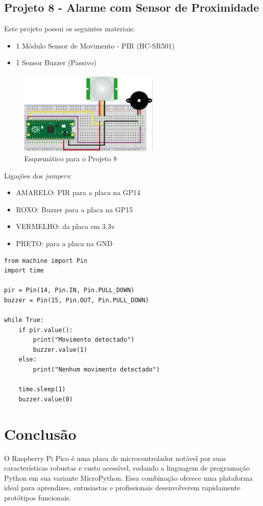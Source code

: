 \documentclass[a4paper,11pt]{article}
\begin{document}
\subsection{Projeto 8 - Alarme com Sensor de Proximidade}

Este projeto possui os seguintes materiais: \vspace{-1em}
\begin{itemize}
	\item 1 Módulo Sensor de Movimento - PIR (HC-SR501)
	\item 1 Sensor Buzzer (Passivo)
\end{itemize}

\begin{figure}[H]
	\centering
	\includegraphics[width=0.6\textwidth]{imagem/PicoProj8}
	\caption{Esquemático para o Projeto 8}
\end{figure}

Ligações dos \textit{jumpers}: \vspace{-1em}
\begin{itemize}
	\item AMARELO: PIR para a placa na GP14
	\item ROXO: Buzzer para a placa na GP15
	\item VERMELHO: da placa em 3.3v
	\item PRETO: para a placa na GND
\end{itemize}

\begin{lstlisting}
from machine import Pin
import time

pir = Pin(14, Pin.IN, Pin.PULL_DOWN)
buzzer = Pin(15, Pin.OUT, Pin.PULL_DOWN)

while True:
    if pir.value():
        print("Movimento detectado")
        buzzer.value(1)
    else:
        print("Nenhum movimento detectado")

    time.sleep(1)
    buzzer.value(0)
\end{lstlisting}


\section{Conclusão}
O Raspberry Pi Pico é uma placa de microcontrolador notável por suas características robustas e custo acessível, rodando a linguagem de programação Python em sua variante MicroPython. Essa combinação oferece uma plataforma ideal para aprendizes, entusiastas e profissionais desenvolverem rapidamente protótipos funcionais. 
\end{document}
